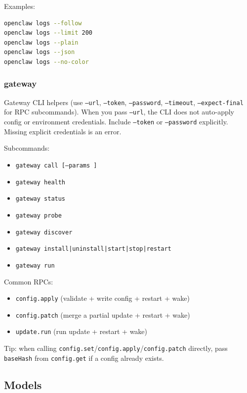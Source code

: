Examples:

\begin{lstlisting}[language=bash]
openclaw logs --follow
openclaw logs --limit 200
openclaw logs --plain
openclaw logs --json
openclaw logs --no-color
\end{lstlisting}


\subsubsection{gateway }


Gateway CLI helpers (use \texttt{--url}, \texttt{--token}, \texttt{--password}, \texttt{--timeout}, \texttt{--expect-final} for RPC subcommands).
When you pass \texttt{--url}, the CLI does not auto-apply config or environment credentials.
Include \texttt{--token} or \texttt{--password} explicitly. Missing explicit credentials is an error.

Subcommands:

\begin{itemize}
  \item \texttt{gateway call  [--params ]}
  \item \texttt{gateway health}
  \item \texttt{gateway status}
  \item \texttt{gateway probe}
  \item \texttt{gateway discover}
  \item \texttt{gateway install|uninstall|start|stop|restart}
  \item \texttt{gateway run}
\end{itemize}


Common RPCs:

\begin{itemize}
  \item \texttt{config.apply} (validate + write config + restart + wake)
  \item \texttt{config.patch} (merge a partial update + restart + wake)
  \item \texttt{update.run} (run update + restart + wake)
\end{itemize}


Tip: when calling \texttt{config.set}/\texttt{config.apply}/\texttt{config.patch} directly, pass \texttt{baseHash} from
\texttt{config.get} if a config already exists.

\subsection{Models}



